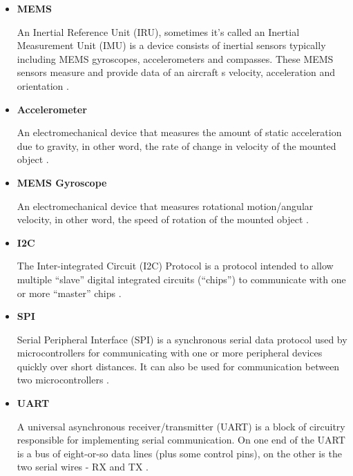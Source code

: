 \begin{itemize}
 	\item \textbf{MEMS}
 	\begin{adjustwidth}{2.5em}{0pt}
	An Inertial Reference Unit (IRU), sometimes it’s called an Inertial Measurement Unit (IMU) is a device consists of inertial sensors typically including MEMS gyroscopes, accelerometers and compasses. These MEMS sensors measure and provide data of an aircraft \textquotesingle s velocity, acceleration and orientation \cite{mems}.
	\\
 	\end{adjustwidth}

 	\item \textbf{Accelerometer}
 	\begin{adjustwidth}{2.5em}{0pt}
	An electromechanical device that measures the amount of static acceleration due to gravity, in other word, the rate of change in velocity of the mounted object \cite{accelerometer}.
	\\
 	\end{adjustwidth}

 	\item \textbf{MEMS Gyroscope}
 	\begin{adjustwidth}{2.5em}{0pt}
	An electromechanical device that measures rotational motion/angular velocity, in other word, the speed of rotation of the mounted object \cite{gyroscope}.
	\\
 	\end{adjustwidth}

 	\item \textbf{I2C}
 	\begin{adjustwidth}{2.5em}{0pt}
	The Inter-integrated Circuit (I2C) Protocol is a protocol intended to allow multiple “slave” digital integrated circuits (“chips”) to communicate with one or more “master” chips \cite{i2c}.
	\\
 	\end{adjustwidth}

 	\item \textbf{SPI}
 	\begin{adjustwidth}{2.5em}{0pt}
	Serial Peripheral Interface (SPI) is a synchronous serial data protocol used by microcontrollers for communicating with one or more peripheral devices quickly over short distances. It can also be used for communication between two microcontrollers \cite{spi}.
	\\
 	\end{adjustwidth}

 	\item \textbf{UART}
 	\begin{adjustwidth}{2.5em}{0pt}
	A universal asynchronous receiver/transmitter (UART) is a block of circuitry responsible for implementing serial communication. On one end of the UART is a bus of eight-or-so data lines (plus some control pins), on the other is the two serial wires - RX and TX \cite{uart}.
	\\
 	\end{adjustwidth}


\end{itemize}
